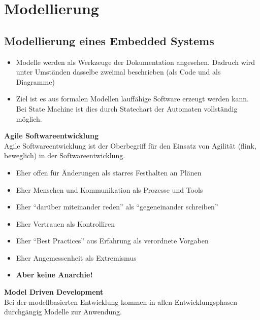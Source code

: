 \section{Modellierung }
\subsection{Modellierung eines Embedded Systems }

\begin{itemize}
	\item Modelle werden als Werkzeuge der Dokumentation angesehen. Dadruch 
	wird unter Umständen dasselbe zweimal beschrieben (als Code und als Diagramme)
	
	\item Ziel ist es aus formalen Modellen lauffähige Software erzeugt werden kann. Bei 
	State Machine ist dies durch Statechart der Automaten vollständig möglich.
\end{itemize}

\textbf{Agile Softwareentwicklung}\\
Agile Softwareentwicklung ist der Oberbegriff für den Einsatz von Agilität (flink, beweglich) in der Softwareentwicklung.
\begin{itemize}
	\item Eher offen für Änderungen als starres Festhalten an Plänen
	\item Eher Menschen und Kommunikation als Prozesse und Tools
	\item Eher "`darüber miteinander reden"' als "`gegeneinander schreiben"'
	\item Eher Vertrauen als Kontrolliren
	\item Eher "`Best Practices"' aus Erfahrung als verordnete Vorgaben
	\item Eher Angemessenheit als Extremismus
	\item \textbf{Aber keine Anarchie!}
\end{itemize} 


\textbf{Model Driven Development}\\
Bei der modellbasierten Entwicklung kommen in allen Entwicklungsphasen durchgängig Modelle zur Anwendung.

